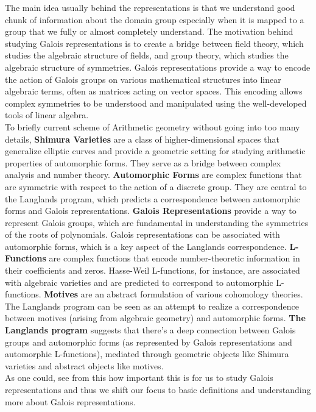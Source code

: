   The main idea usually behind the representations is that we understand good chunk of information about the domain group especially when it is mapped to a group that we fully or almost completely understand. The motivation behind studying Galois representations is to create a bridge between field theory, which studies the algebraic structure of fields, and group theory, which studies the algebraic structure of symmetries. Galois representations provide a way to encode the action of Galois groups on various mathematical structures into linear algebraic terms, often as matrices acting on vector spaces. This encoding allows complex symmetries to be understood and manipulated using the well-developed tools of linear algebra. \\

To briefly current scheme of Arithmetic geometry without going into too many details, \textbf{Shimura Varieties} are a class of higher-dimensional spaces that generalize elliptic curves and provide a geometric setting for studying arithmetic properties of automorphic forms. They serve as a bridge between complex analysis and number theory. \textbf{Automorphic Forms} are complex functions that are symmetric with respect to the action of a discrete group. They are central to the Langlands program, which predicts a correspondence between automorphic forms and Galois representations. \textbf{Galois Representations} provide a way to represent Galois groups, which are fundamental in understanding the symmetries of the roots of polynomials. Galois representations can be associated with automorphic forms, which is a key aspect of the Langlands correspondence. \textbf{L-Functions} are complex functions that encode number-theoretic information in their coefficients and zeros. Hasse-Weil L-functions, for instance, are associated with algebraic varieties and are predicted to correspond to automorphic L-functions. \textbf{Motives} are an abstract formulation of various cohomology theories. The Langlands program can be seen as an attempt to realize a correspondence between motives (arising from algebraic geometry) and automorphic forms. \textbf{The Langlands program} suggests that there's a deep connection between Galois groups and automorphic forms (as represented by Galois representations and automorphic L-functions), mediated through geometric objects like Shimura varieties and abstract objects like motives. \\


As one could, see from this how important this is for us to study Galois representations and thus we shift our focus to basic definitions and understanding more about Galois representations. 

